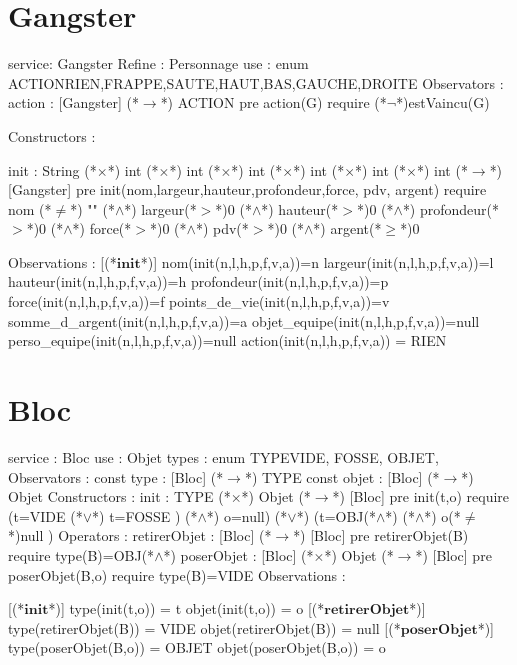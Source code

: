 \documentclass[a4paper, 11pt]{report}
\newcommand{\specB}[1]{\textbf{#1}}
\begin{document}
\section{Gangster}
\begin{Spe}
service: Gangster
Refine : Personnage
use : enum ACTION{RIEN,FRAPPE,SAUTE,HAUT,BAS,GAUCHE,DROITE}
Observators :
	action : [Gangster]  (*$\rightarrow$*) ACTION
		pre action(G) require (*$\lnot$*)estVaincu(G)
		

Constructors : 

	init : String (*$\times$*) int (*$\times$*) int (*$\times$*) int (*$\times$*) int (*$\times$*) int (*$\times$*) int (*$\rightarrow$*) [Gangster]
		pre init(nom,largeur,hauteur,profondeur,force, pdv, argent) require nom (*$\neq$*) "" (*$\land$*) largeur(*$>$*)0 (*$\land$*) hauteur(*$>$*)0 (*$\land$*) profondeur(*$>$*)0 (*$\land$*) force(*$>$*)0 (*$\land$*) pdv(*$>$*)0 (*$\land$*) argent(*$\ge$*)0 
		
Observations :
	[(*$\specB{init}$*)]
		nom(init(n,l,h,p,f,v,a))=n
		largeur(init(n,l,h,p,f,v,a))=l
		hauteur(init(n,l,h,p,f,v,a))=h
		profondeur(init(n,l,h,p,f,v,a))=p
		force(init(n,l,h,p,f,v,a))=f
		points_de_vie(init(n,l,h,p,f,v,a))=v
		somme_d_argent(init(n,l,h,p,f,v,a))=a
		objet_equipe(init(n,l,h,p,f,v,a))=null
		perso_equipe(init(n,l,h,p,f,v,a))=null
		action(init(n,l,h,p,f,v,a)) = RIEN
 
\end{Spe}

\section{Bloc}
\begin{Spe}
service : Bloc
use : Objet
types : enum TYPE{VIDE, FOSSE, OBJET},
Observators :
      const type : [Bloc] (*$\rightarrow$*) TYPE
      const objet : [Bloc] (*$\rightarrow$*) Objet
Constructors :
      init : TYPE (*$\times$*) Objet (*$\rightarrow$*) [Bloc]
            pre init(t,o) require 
            (t=VIDE (*$\lor$*) t=FOSSE ) (*$\land$*) o=null) (*$\lor$*) (t=OBJ(*$\land$*) (*$\land$*) o(*$\ne$*)null ) 
Operators :
      retirerObjet : [Bloc] (*$\rightarrow$*) [Bloc]
            pre retirerObjet(B) require type(B)=OBJ(*$\land$*) 
      poserObjet : [Bloc] (*$\times$*) Objet (*$\rightarrow$*) [Bloc]
            pre poserObjet(B,o) require type(B)=VIDE 
Observations :
     
      [(*$\specB{init}$*)]
            type(init(t,o)) = t
            objet(init(t,o)) = o
      [(*$\specB{retirerObjet}$*)]
            type(retirerObjet(B)) = VIDE
            objet(retirerObjet(B)) = null
      [(*$\specB{poserObjet}$*)] 
            type(poserObjet(B,o)) = OBJET
            objet(poserObjet(B,o)) = o 
     
\end{Spe}
 
\end{document}
